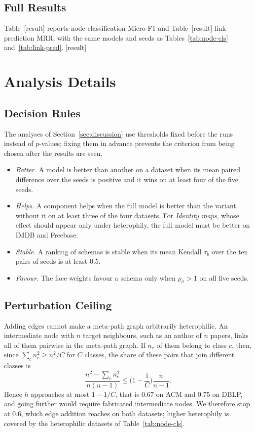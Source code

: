 \documentclass{article}
\newcommand{\res}{{\scriptsize[result]}}
\begin{document}
\subsection{Full Results}
Table~\res{} reports node classification Micro-F1 and Table~\res{} link prediction MRR, with the same models and seeds as Tables~\ref{tab:node-cls} and~\ref{tab:link-pred}. \res{}

\section{Analysis Details}
\label{app:analysis}

\subsection{Decision Rules}
The analyses of Section~\ref{sec:discussion} use thresholds fixed before the runs instead of $p$-values; fixing them in advance prevents the criterion from being chosen after the results are seen.
\begin{itemize}
  \item \emph{Better.} A model is better than another on a dataset when its mean paired difference over the seeds is positive and it wins on at least four of the five seeds.
  \item \emph{Helps.} A component helps when the full model is better than the variant without it on at least three of the four datasets. For \emph{Identity maps}, whose effect should appear only under heterophily, the full model must be better on IMDB and Freebase.
  \item \emph{Stable.} A ranking of schemas is stable when its mean Kendall $\tau_b$ over the ten pairs of seeds is at least 0.5.
  \item \emph{Favour.} The face weights favour a schema only when $\rho_\sigma>1$ on all five seeds.
\end{itemize}

\subsection{Perturbation Ceiling}
Adding edges cannot make a meta-path graph arbitrarily heterophilic. An intermediate node with $n$ target neighbours, such as an author of $n$ papers, links all of them pairwise in the meta-path graph. If $n_c$ of them belong to class $c$, then, since $\sum_cn_c^2\ge n^2/C$ for $C$ classes, the share of these pairs that join different classes is
\begin{equation*}
  \frac{n^2-\sum_cn_c^2}{n(n-1)}\le\Big(1-\frac1C\Big)\frac{n}{n-1}.
\end{equation*}
Hence $h$ approaches at most $1-1/C$, that is 0.67 on ACM and 0.75 on DBLP, and going further would require fabricated intermediate nodes. We therefore stop at 0.6, which edge addition reaches on both datasets; higher heterophily is covered by the heterophilic datasets of Table~\ref{tab:node-cls}.
\end{document}
